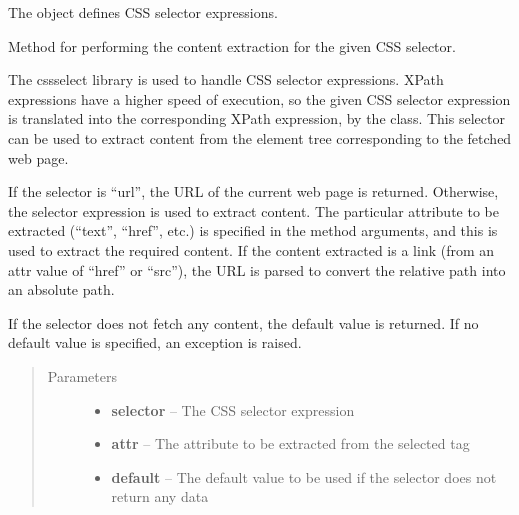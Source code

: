 \documentclass[letterpaper,12pt,english]{sphinxmanual}
\begin{document}
\begin{fulllineitems}
\label{implementation/selectors:scrapple.selectors.css.CssSelector}
The  object defines CSS selector expressions.

\begin{fulllineitems}
\label{implementation/selectors:scrapple.selectors.css.CssSelector.extract_content}
Method for performing the content extraction for the given CSS selector.

The cssselect library is used to handle CSS selector expressions.               XPath expressions have a higher speed of execution, so the given CSS selector           expression is translated into the corresponding XPath expression, by the                 class. This selector can be used to extract content           from the element tree corresponding to the fetched web page.

If the selector is ``url'', the URL of the current web page is returned.
Otherwise, the selector expression is used to extract content. The particular           attribute to be extracted (``text'', ``href'', etc.) is specified in the method             arguments, and this is used to extract the required content. If the content             extracted is a link (from an attr value of ``href'' or ``src''), the URL is parsed          to convert the relative path into an absolute path.

If the selector does not fetch any content, the default value is returned.              If no default value is specified, an exception is raised.
\begin{quote}\begin{description}
\item[{Parameters}] \leavevmode\begin{itemize}
\item {} 
\textbf{selector} -- The CSS selector expression

\item {} 
\textbf{attr} -- The attribute to be extracted from the selected tag

\item {} 
\textbf{default} -- The default value to be used if the selector does not return any data


\end{itemize}
\end{description}
\end{quote}
\end{fulllineitems}
\end{fulllineitems}
\end{document}
